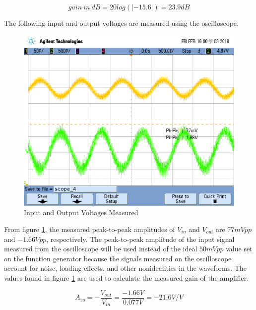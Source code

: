 \begin{equation}
	\label{eq:theoretical_gain_db}
        gain \ in \ dB = 20 log(|-15.6|) = 23.9 dB
\end{equation}

\FloatBarrier

The following input and output voltages are measured using the oscilloscope.

\FloatBarrier

\begin{figure}[h!]
	\centering
		\includegraphics[scale=0.35]{./images/scope_4.png}
		\caption{Input and Output Voltages Measured}
		\label{fig:measured_vin_vout}
\end{figure}

\FloatBarrier

From figure \ref{fig:measured_vin_vout}, the measured peak-to-peak amplitudes of $V_{in}$ and $V_{out}$ are $77 mVpp$ and $-1.66 Vpp$, respectively.
The peak-to-peak amplitude of the input signal measured from the oscilloscope will be used instead of the ideal $50 mVpp$ value set on the function generator because the signals measured on the oscilloscope account for noise, loading effects, and other nonidealities in the waveforms.
The values found in figure \ref{fig:measured_vin_vout} are used to calculate the measured gain of the amplifier.

\FloatBarrier

\begin{equation}
	\label{eq:measured_gain}
	A_{vo} = - \frac{V_{out}}{V_{in}} = \frac{-1.66 V}{0.077 V} = -21.6 V/V
\end{equation}

